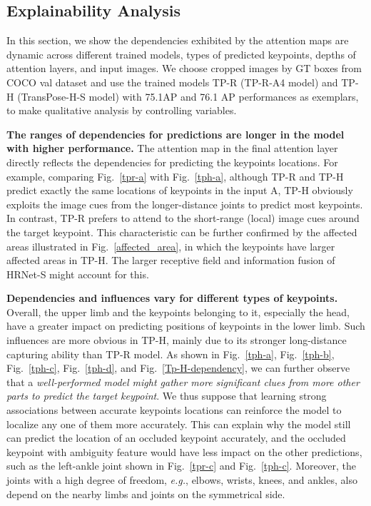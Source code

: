 \documentclass{article}
\begin{document}
\subsection{Explainability Analysis} 

\label{Explainability Analysis}
In this section, we show the dependencies exhibited by the attention maps are dynamic across different trained models, types of predicted keypoints, depths of attention layers, and input images. We choose cropped images by GT boxes from COCO val dataset and use the trained models TP-R (TP-R-A4 model) and TP-H (TransPose-H-S model) with 75.1AP and 76.1 AP performances as exemplars, to make qualitative analysis by controlling variables.

{\bf The ranges of dependencies for predictions are longer in the model with higher performance.} The attention map in the final attention layer directly reflects the dependencies for predicting the keypoints locations. For example, comparing Fig.~\ref{tpr-a} with Fig.~\ref{tph-a}, although TP-R and TP-H predict exactly the same locations of keypoints in the input A, TP-H obviously exploits the image cues from the longer-distance joints to predict most keypoints. In contrast, TP-R prefers to attend to the short-range (local) image cues around the target keypoint. This characteristic can be further confirmed by the affected areas illustrated in Fig.~\ref{affected_area}, in which the keypoints have larger affected areas in TP-H. The larger receptive field and information fusion of HRNet-S might account for this.

{\bf Dependencies and influences vary for different types of keypoints.} Overall, the upper limb and the keypoints belonging to it, especially the head, have a greater impact on predicting positions of keypoints in the lower limb. Such influences are more obvious in TP-H, mainly due to its stronger long-distance capturing ability than TP-R model. As shown in Fig.~\ref{tph-a}, Fig.~\ref{tph-b}, Fig.~\ref{tph-c}, Fig.~\ref{tph-d}, and Fig.~\ref{Tp-H-dependency}, we can further observe that a \emph{well-performed model might gather more significant clues from more other parts to predict the target keypoint}.  We thus suppose that learning strong associations between accurate keypoints locations can reinforce the model to localize any one of them more accurately. This can explain why the model still can predict the location of an occluded keypoint accurately, and the occluded keypoint with ambiguity feature would have less impact on the other predictions, such as the left-ankle joint shown in Fig.~\ref{tpr-c} and Fig.~\ref{tph-c}. Moreover, the joints with a high degree of freedom, \emph{e.g.}, elbows, wrists, knees, and ankles, also depend on the nearby limbs and joints on the symmetrical side.  
\end{document}
